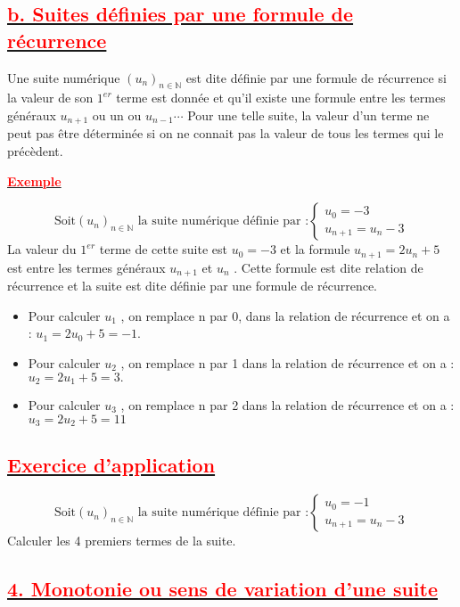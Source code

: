 \documentclass[12pt]{article}
\begin{document}
\subsection*{\underline{\textbf{\textcolor{red}{b. Suites définies par une formule de récurrence}}}}
Une suite numérique $(u_{n})_{n\in\mathbb{N}}$ est dite définie par une formule de récurrence si la valeur de son $1^{er}$ terme
est donnée et qu’il existe une formule entre les termes généraux $u_{n+1}$ ou un ou $u_{n-1}\cdots$
Pour une telle suite, la valeur d’un terme ne peut pas être déterminée si on ne connait pas la valeur de
tous les termes qui le précèdent.

\underline{\textbf{\textcolor{red}{Exemple}}}

\[\text{Soit} (u_{n})_{n\in\mathbb{N}} \text{ la suite numérique définie par :} 
\begin{cases}
u_{0} = -3 \\
u_{n+1} =u_{n}-3
\end{cases}
\]
La valeur du $1^{er}$ terme de cette suite est $u_{0} = -3$ et la formule $u_{n+1} = 2u_{n} + 5$ est entre les termes généraux $u_{n+1}$ et $u_{n}$ . Cette formule est dite relation de récurrence et la suite est dite définie par une formule de récurrence.
\begin{itemize}
\item Pour calculer $u_{1}$ , on remplace n par 0, dans la relation de récurrence et on a : $u_{1} = 2u_{0} + 5 = -1.$

\item Pour calculer $u_{2}$ , on remplace n par 1 dans la relation de récurrence et on a : $u_{2} = 2u_{1} + 5 = 3.$

\item Pour calculer $u_{3}$ , on remplace n par 2 dans la relation de récurrence et on a : $u_{3}= 2u_{2} + 5 = 11$
\end{itemize}
\subsection*{\underline{\textbf{\textcolor{red}{Exercice d'application}}}}
\[\text{Soit} (u_{n})_{n\in\mathbb{N}} \text{ la suite numérique définie par :} 
\begin{cases}
u_{0} = -1 \\
u_{n+1} =u_{n}-3
\end{cases}
\]
Calculer les 4 premiers termes de la suite.
\subsection*{\underline{\textbf{\textcolor{red}{4. Monotonie ou sens de variation d’une suite}}}}
\end{document}

